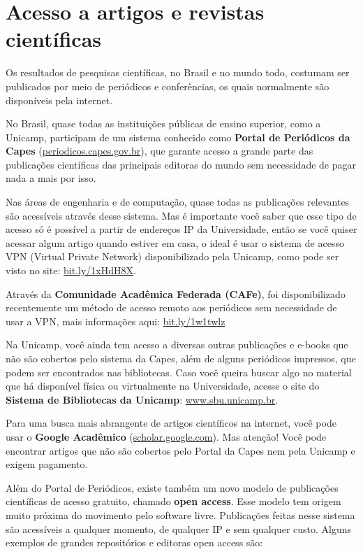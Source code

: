 
\section{Acesso a artigos e revistas científicas}

Os resultados de pesquisas científicas, no Brasil e no mundo todo, costumam ser
publicados por meio de periódicos e conferências, os quais normalmente são
disponíveis pela internet.

No Brasil, quase todas as instituições públicas de ensino superior, como a
Unicamp, participam de um sistema conhecido como \textbf{Portal de Periódicos da
Capes} (\url{periodicos.capes.gov.br}), que garante acesso a grande parte das
publicações científicas das principais editoras do mundo sem necessidade de
pagar nada a mais por isso.

Nas áreas de engenharia e de computação, quase todas as publicações relevantes
são acessíveis através desse sistema. Mas é importante você saber que esse tipo
de acesso só é possível a partir de endereços IP da Universidade, então se você
quiser acessar algum artigo quando estiver em casa, o ideal é usar o sistema de
acesso VPN (Virtual Private Network) disponibilizado pela Unicamp, como pode ser
visto no site: \url{bit.ly/1xHdH8X}.

Através da \textbf{Comunidade Acadêmica Federada (CAFe)}, foi disponibilizado
recentemente um método de acesso remoto aos periódicos sem necessidade de usar a
VPN, mais informações aqui: \url{bit.ly/1w1twlz}

Na Unicamp, você ainda tem acesso a diversas outras publicações e e-books que
não são cobertos pelo sistema da Capes, além de alguns periódicos impressos, que
podem ser encontrados nas bibliotecas. Caso você queira buscar algo no material
que há disponível física ou virtualmente na Universidade, acesse o site do
\textbf{Sistema de Bibliotecas da Unicamp}: \url{www.sbu.unicamp.br}.

Para uma busca mais abrangente de artigos científicos na internet, você pode
usar o \textbf{Google Acadêmico} (\url{scholar.google.com}). Mas atenção! Você
pode encontrar artigos que não são cobertos pelo Portal da Capes nem pela
Unicamp e exigem pagamento.

Além do Portal de Periódicos, existe também um novo modelo de publicações
científicas de acesso gratuito, chamado \textbf{open access}. Esse modelo tem
origem muito próxima do movimento pelo software livre. Publicações feitas nesse
sistema são acessíveis a qualquer momento, de qualquer IP e sem qualquer custo.
Alguns exemplos de grandes repositórios e editoras open access são:

